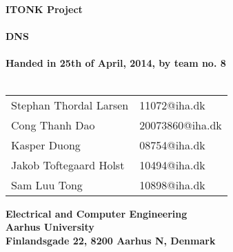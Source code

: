 \begin{titlepage}
\begin{center}
{\LARGE \textbf{ITONK Project}}\\~\\
{\LARGE \textbf{DNS}}\\~\\
\textbf{Handed in 25th of April, 2014, by team no. 8}\\~\\
\begin{tabular}{ll}
Stephan Thordal Larsen & 11072@iha.dk \\
Cong Thanh Dao & 20073860@iha.dk \\
Kasper Duong & 08754@iha.dk \\
Jakob Toftegaard Holst & 10494@iha.dk \\
Sam Luu Tong & 10898@iha.dk \\
\end{tabular}
\vfill
\textbf{Electrical and Computer Engineering}\\
\textbf{Aarhus University}\\
\textbf{Finlandsgade 22, 8200 Aarhus N, Denmark}
\end{center}
\end{titlepage} 